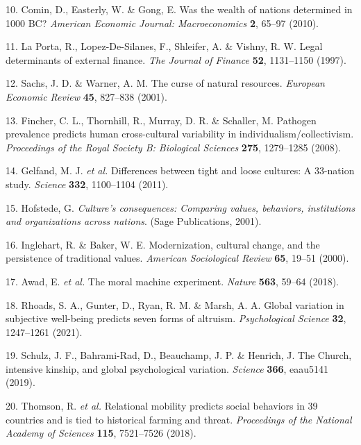 \documentclass[
  english,
  man,floatsintext]{apa6}
\begin{document}
\leavevmode\hypertarget{ref-Comin2010}{}%
10. Comin, D., Easterly, W. \& Gong, E. Was the wealth of nations determined in 1000 BC? \emph{American Economic Journal: Macroeconomics} \textbf{2}, 65--97 (2010).

\leavevmode\hypertarget{ref-LaPorta1997}{}%
11. La Porta, R., Lopez-De-Silanes, F., Shleifer, A. \& Vishny, R. W. Legal determinants of external finance. \emph{The Journal of Finance} \textbf{52}, 1131--1150 (1997).

\leavevmode\hypertarget{ref-Sachs2001}{}%
12. Sachs, J. D. \& Warner, A. M. The curse of natural resources. \emph{European Economic Review} \textbf{45}, 827--838 (2001).

\leavevmode\hypertarget{ref-Fincher2008}{}%
13. Fincher, C. L., Thornhill, R., Murray, D. R. \& Schaller, M. Pathogen prevalence predicts human cross-cultural variability in individualism/collectivism. \emph{Proceedings of the Royal Society B: Biological Sciences} \textbf{275}, 1279--1285 (2008).

\leavevmode\hypertarget{ref-Gelfand2011}{}%
14. Gelfand, M. J. \emph{et al.} Differences between tight and loose cultures: A 33-nation study. \emph{Science} \textbf{332}, 1100--1104 (2011).

\leavevmode\hypertarget{ref-Hofstede2001}{}%
15. Hofstede, G. \emph{Culture's consequences: Comparing values, behaviors, institutions and organizations across nations}. (Sage Publications, 2001).

\leavevmode\hypertarget{ref-Inglehart2000}{}%
16. Inglehart, R. \& Baker, W. E. Modernization, cultural change, and the persistence of traditional values. \emph{American Sociological Review} \textbf{65}, 19--51 (2000).

\leavevmode\hypertarget{ref-Awad2018}{}%
17. Awad, E. \emph{et al.} The moral machine experiment. \emph{Nature} \textbf{563}, 59--64 (2018).

\leavevmode\hypertarget{ref-Rhoads2021}{}%
18. Rhoads, S. A., Gunter, D., Ryan, R. M. \& Marsh, A. A. Global variation in subjective well-being predicts seven forms of altruism. \emph{Psychological Science} \textbf{32}, 1247--1261 (2021).

\leavevmode\hypertarget{ref-Schulz2019}{}%
19. Schulz, J. F., Bahrami-Rad, D., Beauchamp, J. P. \& Henrich, J. The Church, intensive kinship, and global psychological variation. \emph{Science} \textbf{366}, eaau5141 (2019).

\leavevmode\hypertarget{ref-Thomson2018}{}%
20. Thomson, R. \emph{et al.} Relational mobility predicts social behaviors in 39 countries and is tied to historical farming and threat. \emph{Proceedings of the National Academy of Sciences} \textbf{115}, 7521--7526 (2018).
\end{document}
